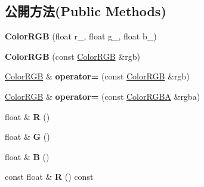 \subsection*{公開方法(Public Methods)}
\begin{DoxyCompactItemize}
\item 
{\bfseries Color\+R\+GB} (float r\+\_, float g\+\_, float b\+\_)\hypertarget{class_magnum_1_1_color_r_g_b_adc98fa7020dc2d5b8e72c561a4b4c768}{}\label{class_magnum_1_1_color_r_g_b_adc98fa7020dc2d5b8e72c561a4b4c768}

\item 
{\bfseries Color\+R\+GB} (const \hyperlink{class_magnum_1_1_color_r_g_b}{Color\+R\+GB} \&rgb)\hypertarget{class_magnum_1_1_color_r_g_b_ac0a2c42c6785391956f818592deee4ed}{}\label{class_magnum_1_1_color_r_g_b_ac0a2c42c6785391956f818592deee4ed}

\item 
\hyperlink{class_magnum_1_1_color_r_g_b}{Color\+R\+GB} \& {\bfseries operator=} (const \hyperlink{class_magnum_1_1_color_r_g_b}{Color\+R\+GB} \&rgb)\hypertarget{class_magnum_1_1_color_r_g_b_a59639f5b1d1c2c6c505e4f6297b635a7}{}\label{class_magnum_1_1_color_r_g_b_a59639f5b1d1c2c6c505e4f6297b635a7}

\item 
\hyperlink{class_magnum_1_1_color_r_g_b}{Color\+R\+GB} \& {\bfseries operator=} (const \hyperlink{class_magnum_1_1_color_r_g_b_a}{Color\+R\+G\+BA} \&rgba)\hypertarget{class_magnum_1_1_color_r_g_b_aa3e346eba29d2a2ceee1626e8baffe81}{}\label{class_magnum_1_1_color_r_g_b_aa3e346eba29d2a2ceee1626e8baffe81}

\item 
float \& {\bfseries R} ()\hypertarget{class_magnum_1_1_color_r_g_b_a1751579ab4b47378f144b6b18a738136}{}\label{class_magnum_1_1_color_r_g_b_a1751579ab4b47378f144b6b18a738136}

\item 
float \& {\bfseries G} ()\hypertarget{class_magnum_1_1_color_r_g_b_adbdc801bc49deda11b2614d3d4672cc4}{}\label{class_magnum_1_1_color_r_g_b_adbdc801bc49deda11b2614d3d4672cc4}

\item 
float \& {\bfseries B} ()\hypertarget{class_magnum_1_1_color_r_g_b_a7a3d853526de0e5b6f7ceafea7b37d4f}{}\label{class_magnum_1_1_color_r_g_b_a7a3d853526de0e5b6f7ceafea7b37d4f}

\item 
const float \& {\bfseries R} () const \hypertarget{class_magnum_1_1_color_r_g_b_a8ee718181c180dc9fe8c2843320e9e57}{}\label{class_magnum_1_1_color_r_g_b_a8ee718181c180dc9fe8c2843320e9e57}


\end{DoxyCompactItemize}
